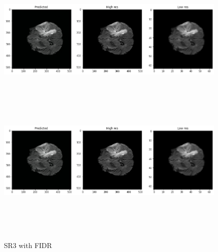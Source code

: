 \begin{figure}[!htbp]
  \begin{center}
    \leavevmode
    \ifpdf
      \includegraphics[height=2in]{Chapter4/images/spam4.png}
    \else
      \includegraphics[bb = 92 86 545 742, height=3in]{Chapter4/images/spam4.png}
    \fi
    \caption{SR3 with FIDR}
    \label{SR3 FIDR}
  \end{center}
\end{figure} 


